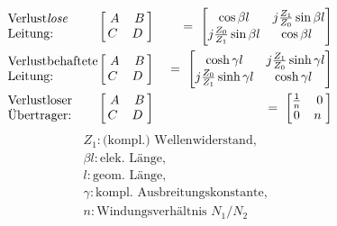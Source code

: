 \begin{itemize}
        \begin{align*}
            &\parbox{2.5cm}{Verlust\textit{lose} Leitung:}
            \begin{bmatrix}\
                A & B\\
                C & D\
            \end{bmatrix}\
            &=\
            \begin{bmatrix}
                \cos\beta l & j\frac{Z_1}{Z_0}\sin\beta l\\
                j\frac{Z_0}{Z_1}\sin\beta l & \cos \beta l\
            \end{bmatrix}\\
            &\parbox{2.5cm}{Verlustbehaftete Leitung:}
            \begin{bmatrix}\
                A & B\\ C & D\
            \end{bmatrix}\
            &=\
            \begin{bmatrix}
                \cosh\gamma l & j\frac{Z_1}{Z_0}\sinh\gamma l\\
                j\frac{Z_0}{Z_1}\sinh\gamma l & \cosh\gamma l\
            \end{bmatrix}\\
            &\parbox{2.5cm}{Verlustloser Übertrager:}
            \begin{bmatrix}\
                A & B\\
                C & D\
            \end{bmatrix}\
            &=\
            \begin{bmatrix}
                \frac{1}{n} & 0\\
                0 & n\
            \end{bmatrix}
        \end{align*}
        \begin{align*}
            &Z_1: \text{(kompl.) Wellenwiderstand,}\\
            &\beta l: \text{elek. Länge,}\\
            &l: \text{geom. Länge,}\\
            &\gamma: \text{kompl. Ausbreitungskonstante,}\\
            &n: \text{Windungsverhältnis } N_1/N_2
        \end{align*}
\end{itemize}



